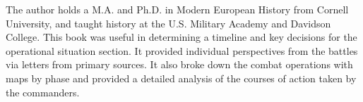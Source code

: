 %
%
%
%
The author holds a M.A. and Ph.D.  in Modern European History from Cornell
University, and taught history at the U.S. Military Academy and Davidson
College. This book was useful in determining a timeline and key decisions for
the operational situation section. It provided individual perspectives from the
battles via letters from primary sources. It also broke down the combat
operations with maps by phase and provided a detailed analysis of the courses of
action taken by the commanders.
